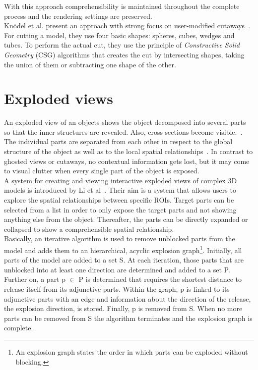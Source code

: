 With this approach comprehensibility is maintained throughout the complete process and the rendering settings are preserved.\\
\newline
Kn{\"o}del et al. present an approach with strong focus on user-modified cutaways~\cite{incoll:cutawayIllustration}. For cutting a model, they use four basic shapes: spheres, cubes, wedges and tubes. To perform the actual cut, they use the principle of \emph{Constructive Solid Geometry} (CSG) algorithms that creates the cut by intersecting shapes, taking the union of them or subtracting one shape of the other.\\

\section{Exploded views}
An exploded view of an objects shows the object decomposed into several parts so that the inner structures are revealed. Also, cross-sections become visible.~\cite{jour:explodedView}. The individual parts are separated from each other in respect to the global structure of the object as well as to the local spatial relationships~\cite{jour:generationExplodedView}. In contrast to ghosted views or cutaways, no contextual information gets lost, but it may come to visual clutter when every single part of the object is exposed.\\
\newline
A system for creating and viewing interactive exploded views of complex 3D models is introduced by Li et al~\cite{jour:generationExplodedView}. Their aim is a system that allows users to explore the spatial relationships between specific ROIs. Target parts can be selected from a list in order to only expose the target parts and not showing anything else from the object. Thereafter, the parts can be directly expanded or collapsed to show a comprehensible spatial relationship.\\
Basically, an iterative algorithm is used to remove unblocked parts from the model and adds them to an hierarchical, acyclic explosion graph\footnote{An explosion graph states the order in which parts can be exploded without blocking.}. Initially, all parts of the model are added to a set S. At each iteration, those parts that are unblocked into at least one direction are determined and added to a set P. Further on, a part p $\in$ P is determined that requires the shortest distance to release itself from its adjunctive parts. Within the graph, p is linked to its adjunctive parts with an edge and information about the direction of the release, the explosion direction, is stored. Finally, p is removed from S. When no more parts can be removed from S the algorithm terminates and the explosion graph is complete.\\
